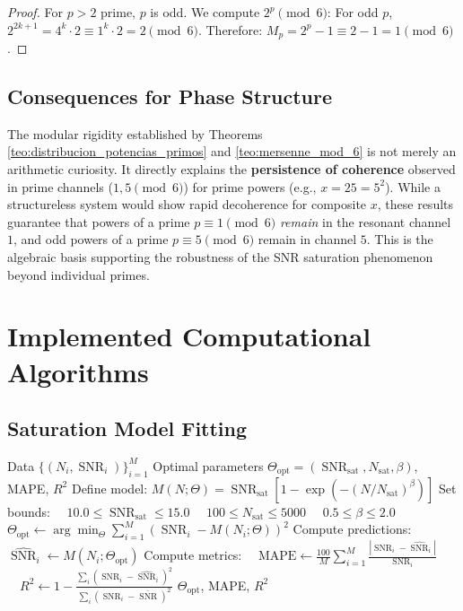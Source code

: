 \documentclass[12pt, a4paper]{article}
\theoremstyle{plain}
\theoremstyle{definition}
\theoremstyle{remark}
\newcommand{\SNR}{\operatorname{SNR}}
\begin{document}
\begin{proof}
For $p > 2$ prime, $p$ is odd. We compute $2^p \pmod{6}$:
For odd $p$, $2^{2k+1} = 4^k \cdot 2 \equiv 1^k \cdot 2 = 2 \pmod{6}$.
Therefore: $M_p = 2^p - 1 \equiv 2 - 1 = 1 \pmod{6}$.
\end{proof}

\subsection{Consequences for Phase Structure}
The modular rigidity established by Theorems \ref{teo:distribucion_potencias_primos} and \ref{teo:mersenne_mod_6} is not merely an arithmetic curiosity. It directly explains the \textbf{persistence of coherence} observed in prime channels ($1,5 \pmod{6}$) for prime powers (e.g., $x=25=5^2$). While a structureless system would show rapid decoherence for composite $x$, these results guarantee that powers of a prime $p \equiv 1 \pmod{6}$ \textit{remain} in the resonant channel $1$, and odd powers of a prime $p \equiv 5 \pmod{6}$ remain in channel $5$. This is the algebraic basis supporting the robustness of the SNR saturation phenomenon beyond individual primes.

\section{Implemented Computational Algorithms}
\label{ap:algoritmos}

\subsection{Saturation Model Fitting}
\label{ap:ajuste_snr}

\begin{algorithm}[H]
\caption{Robust Fitting of SNR Dynamics}
\label{alg:ajuste_snr_detalle}
\begin{algorithmic}[1]
\Require Data $\{(N_i, \SNR_i)\}_{i=1}^M$
\Ensure Optimal parameters $\Theta_{\text{opt}} = (\SNR_{\text{sat}}, N_{\text{sat}}, \beta)$, MAPE, $R^2$
\State Define model: $M(N; \Theta) = \SNR_{\text{sat}} [1 - \exp(-(N/N_{\text{sat}})^\beta)]$
\State Set bounds:
    \State $\quad 10.0 \leq \SNR_{\text{sat}} \leq 15.0$
    \State $\quad 100 \leq N_{\text{sat}} \leq 5000$
    \State $\quad 0.5 \leq \beta \leq 2.0$
\State $\Theta_{\text{opt}} \gets \arg\min_{\Theta} \sum_{i=1}^M \left( \SNR_i - M(N_i; \Theta) \right)^2$ 
\State Compute predictions: $\widehat{\SNR}_i \gets M(N_i; \Theta_{\text{opt}})$
\State Compute metrics:
\State $\quad \text{MAPE} \gets \frac{100}{M} \sum_{i=1}^M \frac{|\SNR_i - \widehat{\SNR}_i|}{\SNR_i}$ 
\State $\quad R^2 \gets 1 - \frac{\sum_i (\SNR_i - \widehat{\SNR}_i)^2}{\sum_i (\SNR_i - \bar{\SNR})^2}$ 
\State \Return $\Theta_{\text{opt}}$, MAPE, $R^2$
\end{algorithmic}
\end{algorithm}
\end{document}
